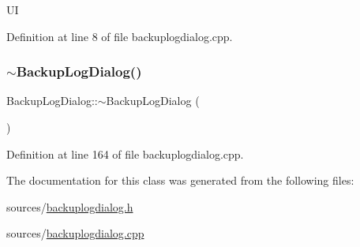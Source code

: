 UI 

Definition at line 8 of file backuplogdialog.\+cpp.

\mbox{\label{class_backup_log_dialog_a908aa32b222e2d7fb0b5714c51dbe13c}} 
\subsubsection{\texorpdfstring{$\sim$\+Backup\+Log\+Dialog()}{~BackupLogDialog()}}
{\footnotesize\ttfamily Backup\+Log\+Dialog\+::$\sim$\+Backup\+Log\+Dialog (\begin{DoxyParamCaption}{ }\end{DoxyParamCaption})}



Definition at line 164 of file backuplogdialog.\+cpp.



The documentation for this class was generated from the following files\+:\begin{DoxyCompactItemize}
\item 
sources/\mbox{\hyperlink{backuplogdialog_8h}{backuplogdialog.\+h}}\item 
sources/\mbox{\hyperlink{backuplogdialog_8cpp}{backuplogdialog.\+cpp}}\end{DoxyCompactItemize}
